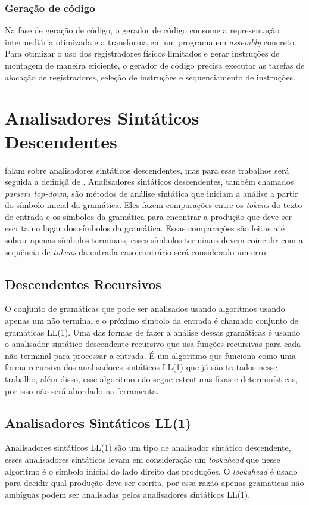 \subsubsection{Geração de código}
Na fase de geração de código, o gerador de código consome a representação intermediária otimizada e a transforma em um programa em \textit{assembly} concreto. Para otimizar o uso dos registradores físicos limitados e gerar instruções de montagem de maneira eficiente, o gerador de código precisa executar as tarefas de alocação de registradores, seleção de instruções e sequenciamento de instruções.

\section{Analisadores Sintáticos Descendentes}
\textcite{cooper2022engineering,mogensen2024introduction, thain2020introduction} falam sobre analisadores sintáticos descendentes, mas para esse trabalhos será seguida a definiçã de \textcite{thain2020introduction}. Analisadores sintáticos descendentes, também chamados \textit{parsers top-down}, são métodos de análise sintática que iniciam a análise a partir do símbolo inicial da gramática. Eles fazem comparações entre os \textit{tokens} do texto de entrada e os símbolos da gramática para encontrar a produção que deve ser escrita no lugar dos símbolos da gramática. Essas comparações são feitas até sobrar apenas símbolos terminais, esses símbolos terminais devem coincidir com a sequência de \textit{tokens} da entrada caso contrário será considerado um erro.

\subsection{Descendentes Recursivos}
O conjunto de gramáticas que pode ser analisados usando algoritmos usando apenas um não terminal e o próximo símbolo da entrada é chamado conjunto de gramáticas LL(1). Uma das formas de fazer a análise dessas gramáticas é usando o analisador sintático descendente recursivo que usa funções recursivas para cada não terminal para processar a entrada. É um algoritmo que funciona como uma forma recursiva dos analisadores sintáticos LL(1) que já são tratados nesse trabalho, além disso, esse algoritmo não segue estruturas fixas e determinísticas, por isso não será abordado na ferramenta.

\subsection{Analisadores Sintáticos LL(1)}
Analisadores sintáticos LL(1) são um tipo de analisador sintático descendente, esses analisadores sintáticos levam em consideração um \textit{lookahead} que nesse algoritmo é o símbolo inicial do lado direito das produções. O \textit{lookahead} é usado para decidir qual produção deve ser escrita, por essa razão apenas gramaticas não ambíguas podem ser analisadas pelos analisadores sintáticos LL(1).

